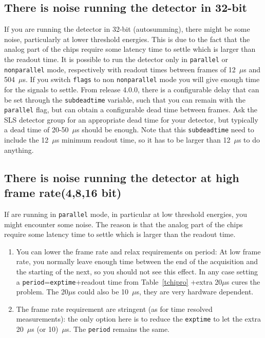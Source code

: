 \documentclass{article}
\begin{document}
{{{\subsection{There is noise running the detector in 32-bit}
If you are running the detector in 32-bit (autosumming), there might be some noise, particularly at lower threshold energies. This is due to the fact that the analog part of the chips require some latency time to settle which is larger than the readout time. It is possible to run the detector only in {\tt{parallel}} or {\tt{nonparallel}} mode, respectively with readout times between frames of 12~$\mu$s and 504~$\mu$s. If you switch {\tt{flags}} to non {\tt{nonparallel}} mode you will give enough time for the signals to settle. From release 4.0.0, there is a configurable delay that can be set through the {\tt{subdeadtime}} variable, such that you can remain with the {\tt{parallel}} flag, but can obtain a configurable dead time between frames. Ask the SLS detector group for an appropriate dead time for your detector, but typically a dead time of 20-50~$\mu$s should be enough. Note that this {\tt{subdeadtime}} need to include the 12~$\mu$s minimum readout time, so it has to be larger than 12~$\mu$s to do anything.  
 
\subsection{There is noise running the detector at high frame rate(4,8,16 bit)}
If are running in {\tt{parallel}} mode, in particular at low threshold energies, you might encounter some noise. The reason is that the analog part of the chips require some latency time to settle which is larger than the readout time. 
\begin{enumerate}
\item You can lower the frame rate and relax requirements on period: 
At low frame rate, you normally leave enough time between the end of the acquisition and the starting of the next, so you should not see this effect. In any case setting a {\tt{period}}={\tt{exptime}}+readout time from Table~\ref{tchipro} +extra 20$\mu$s cures the problem. The 20$\mu$s could also be 10~$\mu$s, they are very hardware dependent.
\item The frame rate requirement are stringent (as for time resolved measurements): the only option here is to reduce the {\tt{exptime}} to let the extra 20~$\mu$s (or 10)~$\mu$s. The {\tt{period}} remains the same.
\end{enumerate} 
 
}}}
\end{document}
